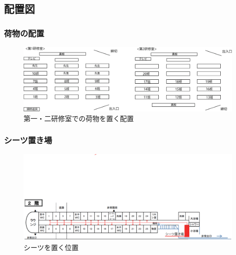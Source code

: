 \subsection{配置図}

\subsubsection{荷物の配置}

\begin{figure}[htbp]
 \begin{center}
  \includegraphics[width=150mm]{./03/nimotsu.eps}
\end{center}
 \caption{第一・二研修室での荷物を置く配置}
 \label{fig:nimotsuhaichi}
\end{figure}
\vspace{-10mm}
\subsubsection{シーツ置き場}

\vspace{-30mm}

\begin{figure}[H]
 \begin{center}
 \hspace{-20mm}
  \includegraphics[width=180mm,scale=0.45]{./03/situ.eps}
\end{center}
\vspace{-15mm}
 \caption{シーツを置く位置}
 \label{fig:seatshaichi}
\end{figure}

